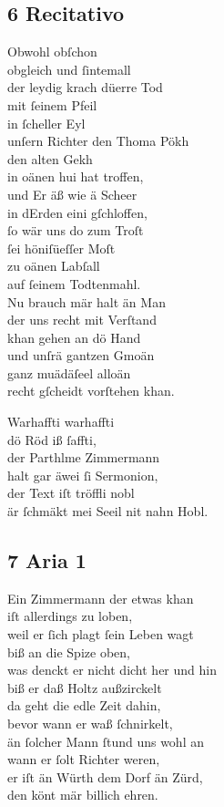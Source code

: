 \documentclass{ees}
\newenvironment{lyrics}[1]{%
  \subsection{#1}\nopagebreak%
  \begin{lyricslist}%
  \let\voice\item%
}{%
  \end{lyricslist}%
}
\begin{document}
\begin{lyrics}{6 Recitativo}
  \voice[Barthlme]
  Obwohl obſchon\\
  obgleich und ſintemall\\
  der leydig krach düerre Tod\\
  mit ſeinem Pfeil\\
  in ſcheller Eyl\\
  unſern Richter den Thoma Pökh\\
  den alten Gekh\\
  in oänen hui hat troffen,\\
  und Er äß wie ä Scheer\\
  in dErden eini gſchloffen,\\
  ſo wär uns do zum Troſt\\
  ſei höniſüeſſer Moſt\\
  zu oänen Labſall\\
  auf ſeinem Todtenmahl.\\
  Nu brauch mär halt än Man\\
  der uns recht mit Verſtand\\
  khan gehen an dö Hand\\
  und unſrä gantzen Gmoän\\
  ganz muädäſeel alloän\\
  recht gſcheidt vorſtehen khan.

  \voice[Schullmeiſter]
  Warhaffti warhaffti\\
  dö Röd iß ſaffti,\\
  der Parthlme Zimmermann\\
  halt gar äwei ſi Sermonion,\\
  der Text iſt tröffli nobl\\
  är ſchmäkt mei Seeil nit nahn Hobl.
\end{lyrics}

\begin{lyrics}{7 Aria 1}
  \voice[Barthlme]
  Ein Zimmermann der etwas khan\\
  iſt allerdings zu loben,\\
  weil er ſich plagt ſein Leben wagt\\
  biß an die Spize oben,\\
  was denckt er nicht dicht her und hin\\
  biß er daß Holtz außzirckelt\\
  da geht die edle Zeit dahin,\\
  bevor wann er waß ſchnirkelt,\\
  än ſolcher Mann ſtund uns wohl an\\
  wann er ſolt Richter weren,\\
  er iſt än Würth dem Dorf än Zürd,\\
  den könt mär billich ehren.
\end{lyrics}
\end{document}
